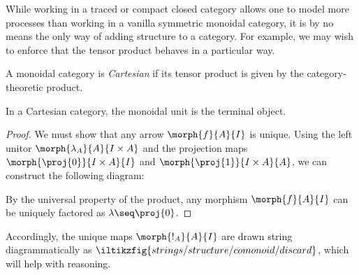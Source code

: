 While working in a traced or compact closed category allows one to model more
processes than working in a vanilla symmetric monoidal category, it is by no
means the only way of adding structure to a category.
For example, we may wish to enforce that the tensor product behaves in a
particular way.

\begin{definition}
    A monoidal category is \emph{Cartesian} if its tensor product is given by
    the category-theoretic product.
\end{definition}

\begin{lemma}
    In a Cartesian category, the monoidal unit is the terminal object.
\end{lemma}
\begin{proof}
    We must show that any arrow \(\morph{f}{A}{I}\) is unique.
    Using the left unitor \(\morph{\lambda_A}{A}{I \times A}\) and the
    projection maps \(\morph{\proj{0}}{I \times A}{I}\) and
    \(\morph{\proj{1}}{I \times A}{A}\), we can construct the following diagram:
    \begin{center}
        \vspace{0.5em}
    \end{center}
    By the universal property of the product, any morphism \(\morph{f}{A}{I}\)
    can be uniquely factored as \(\lambda \seq \proj{0}\).
\end{proof}

Accordingly, the unique maps \(\morph{!_A}{A}{I}\) are drawn string
diagrammatically as \(
\iltikzfig{strings/structure/comonoid/discard}
\), which will help with reasoning.

